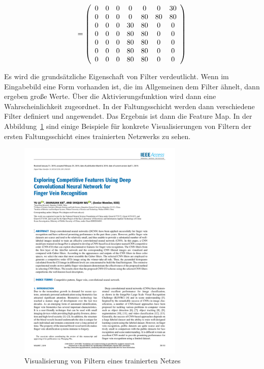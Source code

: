 $$
=
\left(
\begin{array}{ccc ccc c}
    0 & 0 & 0 &  0 & 0  &  0 & 30 \\
    0 & 0 & 0 &  0 & 80 & 80 & 80 \\
    0 & 0 & 0 & 30 & 80 &  0 &  0 \\
    0 & 0 & 0 & 80 & 80 &  0 &  0 \\
    0 & 0 & 0 & 80 & 80 &  0 &  0 \\
    0 & 0 & 0 & 80 & 80 &  0 &  0 \\
    0 & 0 & 0 & 80 & 80 &  0 &  0 \\
\end{array}
\right)
$$  

Es wird die grundsätzliche Eigenschaft von Filter verdeutlicht. Wenn im Eingabebild eine Form vorhanden ist, die im Allgemeinen dem Filter ähnelt, dann ergeben große Werte. Über die Aktivierungsfunktion wird dann eine Wahrscheinlichkeit zugeordnet. In der Faltungsschicht werden dann verschiedene Filter definiert und angewendet. Das Ergebnis ist dann die Feature Map. In der Abbildung~\ref{concept:FilterVis} sind einige Beispiele für konkrete Visualisierungen von Filtern der ersten Faltungsschicht eines trainierten Netzwerks zu sehen. 


\begin{figure}[!h]
  \centering
  
  \includegraphics[viewport=0 350 280 480,clip,page=2,width=0.7\textwidth]{../../MLbib/CNN/08663285.pdf}
    
  \caption{Visualisierung von Filtern eines trainierten Netzes \cite{Lu:2019,Shang:2016}}\label{concept:FilterVis}
\end{figure}


